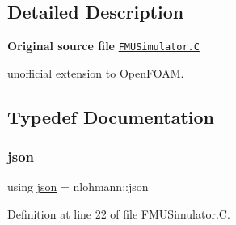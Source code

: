 \subsection{Detailed Description}
{\bfseries Original source file} \href{../../../home/carlo/data/GeN-Foam/GeN-Foam_ffn/GeN-Foam/GeN-Foam/FMU4FOAM/src/OF_FMU/pyFMUSim/FMUSimulator.C}{\tt F\+M\+U\+Simulator.\+C}

\begin{DoxyVerb}unofficial extension to OpenFOAM.\end{DoxyVerb}


\subsection{Typedef Documentation}
\mbox{\label{FMUSimulator_8C_ab701e3ac61a85b337ec5c1abaad6742d}} 
\subsubsection{\texorpdfstring{json}{json}}
{\footnotesize\ttfamily using \hyperlink{dictModifier_8C_ab701e3ac61a85b337ec5c1abaad6742d}{json} =  nlohmann\+::json}



Definition at line 22 of file F\+M\+U\+Simulator.\+C.

